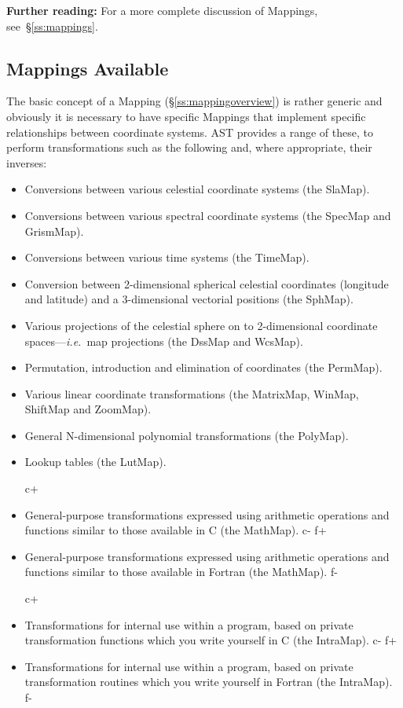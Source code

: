 \documentclass[twoside,11pt]{article}
\newcommand{\secref}[1]{\S\ref{#1}}
\newcommand{\secref}[1]{\ref{#1}}
\begin{document}
{\bf{Further reading:}} For a more complete discussion of Mappings,
see~\secref{ss:mappings}.

\subsection{\label{ss:mappingselection}Mappings Available}

The basic concept of a Mapping (\secref{ss:mappingoverview}) is rather
generic and obviously it is necessary to have specific Mappings that
implement specific relationships between coordinate systems. AST
provides a range of these, to perform transformations such as the
following and, where appropriate, their inverses:

\begin{itemize}
\item Conversions between various celestial coordinate systems (the
SlaMap).

\item Conversions between various spectral coordinate systems (the
SpecMap and GrismMap).

\item Conversions between various time systems (the TimeMap).

\item Conversion between 2-dimensional spherical celestial coordinates
(longitude and latitude) and a 3-dimensional vectorial positions (the SphMap).

\item Various projections of the celestial sphere on to 2-dimensional
coordinate spaces---{\em{i.e.}}\ map projections (the DssMap and WcsMap).

\item Permutation, introduction and elimination of coordinates (the
PermMap).

\item Various linear coordinate transformations (the MatrixMap, WinMap,
ShiftMap and ZoomMap).

\item General N-dimensional polynomial transformations (the PolyMap).

\item Lookup tables (the LutMap).

c+
\item General-purpose transformations expressed using arithmetic
operations and functions similar to those available in C (the
MathMap).
c-
f+
\item General-purpose transformations expressed using arithmetic
operations and functions similar to those available in Fortran (the
MathMap).
f-

c+
\item Transformations for internal use within a program, based on
private transformation functions which you write yourself in C (the
IntraMap).
c-
f+
\item Transformations for internal use within a program, based on
private transformation routines which you write yourself in Fortran
(the IntraMap).
f-
\end{itemize}
\end{document}
